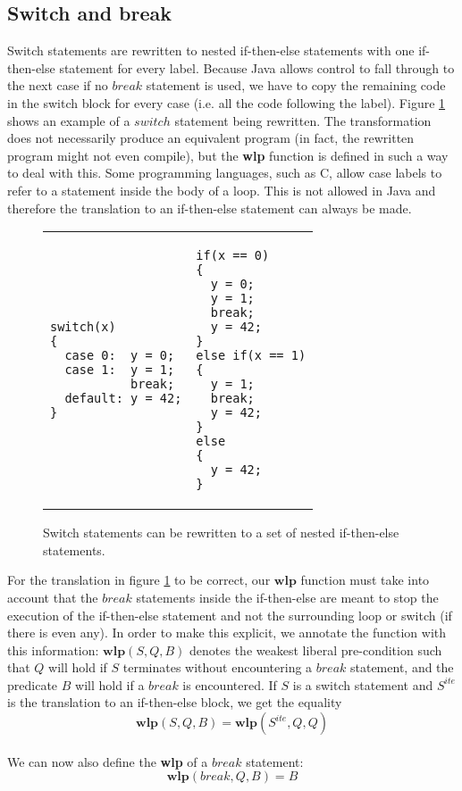 \documentclass[a4paper, fleqn]{article}
\newcommand{\wlp}{\textbf{wlp}\xspace}
\begin{document}
\subsection{Switch and break}
Switch statements are rewritten to nested if-then-else statements with one if-then-else statement for every label. Because Java allows control to fall through to the next case if no $break$ statement is used, we have to copy the remaining code in the switch block for every case (i.e. all the code following the label). Figure \ref{switch} shows an example of a $switch$ statement being rewritten. The transformation does not necessarily produce an equivalent program (in fact, the rewritten program might not even compile), but the \wlp function is defined in such a way to deal with this. Some programming languages, such as C, allow case labels to refer to a statement inside the body of a loop. This is not allowed in Java and therefore the translation to an if-then-else statement can always be made.

\begin{figure}[H]
\begin{tabular}{ p{5.5cm} | p{5cm}}
\begin{lstlisting}
switch(x)
{
  case 0:  y = 0;
  case 1:  y = 1;
           break;
  default: y = 42;
}
\end{lstlisting}
&
\begin{lstlisting}
if(x == 0)
{
  y = 0;
  y = 1;
  break;
  y = 42;
}
else if(x == 1)
{
  y = 1;
  break;
  y = 42;
}
else
{
  y = 42;
}
\end{lstlisting}
\end{tabular}\caption{Switch statements can be rewritten to a set of nested if-then-else statements.}
\label{switch}
\end{figure}

For the translation in figure \ref{switch} to be correct, our $\wlp$ function must take into account that the $break$ statements inside the if-then-else are meant to stop the execution of the if-then-else statement and not the surrounding loop or switch (if there is even any). In order to make this explicit, we annotate the function with this information: $\wlp(S, Q, B)$ denotes the weakest liberal pre-condition such that $Q$ will hold if $S$ terminates without encountering a $break$ statement, and the predicate $B$ will hold if a $break$ is encountered. If $S$ is a switch statement and $S^{ite}$ is the translation to an if-then-else block, we get the equality \[\wlp(S, Q, B) = \wlp(S^{ite}, Q, Q)\]
\\
We can now also define the \wlp of a $break$ statement: \[\wlp(break, Q, B) = B\]
\end{document}
